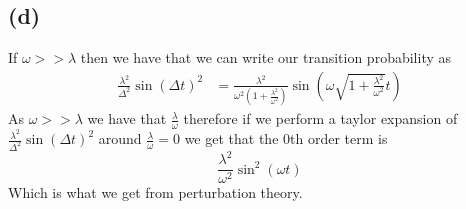 \documentclass[11pt]{article}
\begin{document}
\subsection*{(d)}
If $\omega>>\lambda$ then we have that we can write our transition probability
as 
\begin{align*}
    \frac{\lambda^2}{\Delta^2}\sin(\Delta t)^2 &= \frac{\lambda^2}{\omega^2\left(1+\frac{\lambda^2}{\omega^2}\right)}\sin\left(\omega\sqrt{1+\frac{\lambda^2}{\omega^2}}t\right)
\end{align*}
As $\omega>>\lambda$ we have that $\frac{\lambda}{\omega}$ therefore 
if we perform a taylor expansion of $\frac{\lambda^2}{\Delta^2}\sin(\Delta t)^2$
around $\frac{\lambda}{\omega}=0$ we get that the $0$th order term is
$$\frac{\lambda^2}{\omega^2}\sin^2(\omega t)$$
Which is what we get from perturbation theory.
\end{document}

